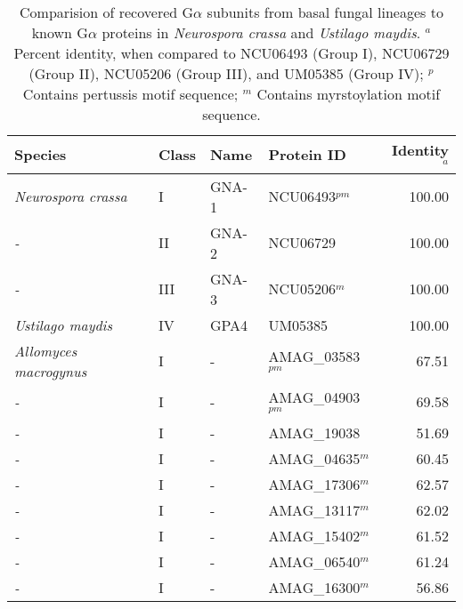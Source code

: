 
{\renewcommand{\arraystretch}{0.5} %
{\footnotesize %
\begin{longtable}{llllr}
\caption[G$\alpha$ subunit comparison]{Comparision of recovered G$\alpha$ subunits from basal fungal lineages to known G$\alpha$ proteins in \textit{Neurospora crassa} and \textit{Ustilago maydis}. $^{a}$ Percent identity, when compared to NCU06493 (Group I), NCU06729 (Group II), NCU05206 (Group III), and UM05385 (Group IV); $^{p}$ Contains pertussis motif sequence; $^{m}$ Contains myrstoylation motif sequence.} \label{tab:ChRhodA_GAcomp} \\
  \hline
Species & Class & Name & Protein ID & Identity$^{a}$ \\ 
  \hline
\emph{Neurospora crassa } & I & GNA-1 & NCU06493$^{pm}$ & 100.00 \\ 
  \emph{-} & II & GNA-2 & NCU06729 & 100.00 \\ 
  \emph{-} & III & GNA-3 & NCU05206$^{m}$ & 100.00 \\ 
  \emph{Ustilago maydis} & IV & GPA4 & UM05385 & 100.00 \\ 
  \emph{Allomyces macrogynus} & I & - & AMAG\_03583$^{pm}$ & 67.51 \\ 
  \emph{-} & I & - & AMAG\_04903$^{pm}$ & 69.58 \\ 
  \emph{-} & I & - & AMAG\_19038 & 51.69 \\ 
  \emph{-} & I & - & AMAG\_04635$^{m}$ & 60.45 \\ 
  \emph{-} & I & - & AMAG\_17306$^{m}$ & 62.57 \\ 
  \emph{-} & I & - & AMAG\_13117$^{m}$ & 62.02 \\ 
  \emph{-} & I & - & AMAG\_15402$^{m}$ & 61.52 \\ 
  \emph{-} & I & - & AMAG\_06540$^{m}$ & 61.24 \\ 
  \emph{-} & I & - & AMAG\_16300$^{m}$ & 56.86 \\ 

\end{longtable}}}
